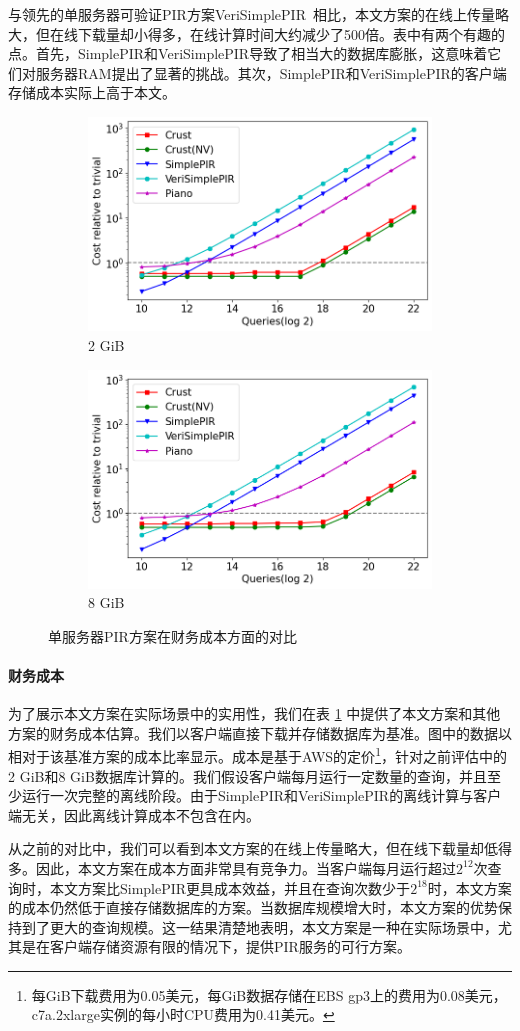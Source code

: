 与领先的单服务器可验证PIR方案VeriSimplePIR~\cite{VeriSimplePIR}相比，本文方案的在线上传量略大，但在线下载量却小得多，在线计算时间大约减少了500倍。表中有两个有趣的点。首先，SimplePIR和VeriSimplePIR导致了相当大的数据库膨胀，这意味着它们对服务器RAM提出了显著的挑战。其次，SimplePIR和VeriSimplePIR的客户端存储成本实际上高于本文。

\begin{figure}
    \begin{subfigure}{0.5\textwidth}
        \centering
        \includegraphics[width=0.8\linewidth]{figure/cost_2gb.png}
        \caption{2 GiB}
    \end{subfigure}%
    \begin{subfigure}{0.5\textwidth}
        \centering
        \includegraphics[width=0.8\linewidth]{figure/cost_8gb.png}
        \caption{8 GiB}
    \end{subfigure}%
    \caption{单服务器PIR方案在财务成本方面的对比}
    \label{fig:single-server-cost}
\end{figure}

\paragraph{财务成本}
为了展示本文方案在实际场景中的实用性，我们在表 \ref{fig:single-server-cost} 中提供了本文方案和其他方案的财务成本估算。我们以客户端直接下载并存储数据库为基准。图中的数据以相对于该基准方案的成本比率显示。成本是基于AWS的定价\footnote{每GiB下载费用为0.05美元，每GiB数据存储在EBS gp3上的费用为0.08美元，c7a.2xlarge实例的每小时CPU费用为0.41美元。}，针对之前评估中的2 GiB和8 GiB数据库计算的。我们假设客户端每月运行一定数量的查询，并且至少运行一次完整的离线阶段。由于SimplePIR和VeriSimplePIR的离线计算与客户端无关，因此离线计算成本不包含在内。

从之前的对比中，我们可以看到本文方案的在线上传量略大，但在线下载量却低得多。因此，本文方案在成本方面非常具有竞争力。当客户端每月运行超过$2^{12}$次查询时，本文方案比SimplePIR更具成本效益，并且在查询次数少于$2^{18}$时，本文方案的成本仍然低于直接存储数据库的方案。当数据库规模增大时，本文方案的优势保持到了更大的查询规模。这一结果清楚地表明，本文方案是一种在实际场景中，尤其是在客户端存储资源有限的情况下，提供PIR服务的可行方案。